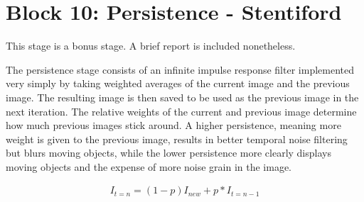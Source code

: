 
\section{Block 10: Persistence - Stentiford}

This stage is a bonus stage. A brief report is included nonetheless.

The persistence stage consists of an infinite impulse response filter 
implemented very simply by taking weighted averages of the current 
image and the previous image. The resulting image is then saved to be 
used as the previous image in the next iteration. The relative weights 
of the current and previous image determine how much previous images 
stick around. A higher persistence, meaning more weight is given to the 
previous image, results in better temporal noise filtering but blurs 
moving objects, while the lower persistence more clearly displays moving 
objects and the expense of more noise grain in the image.

\begin{align*}
    I_{t = n} = (1 - p)I_{new} + p*I_{t = n - 1}
\end{align*}